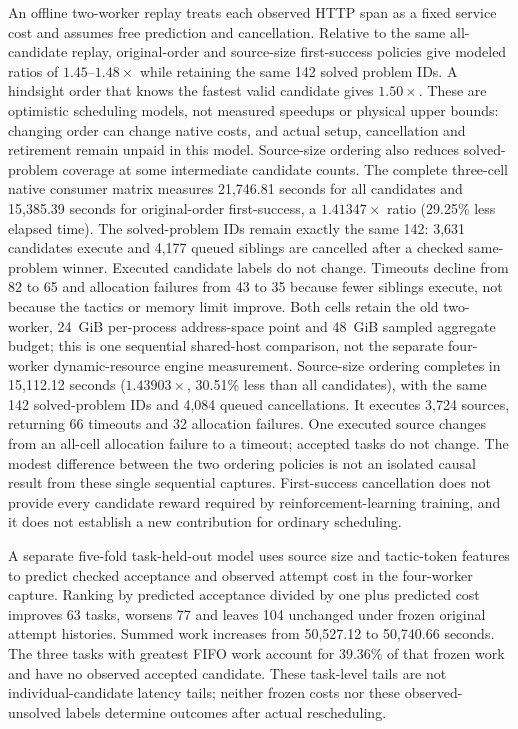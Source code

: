 \documentclass[10pt,twocolumn]{article}
\begin{document}
An offline two-worker replay treats each observed HTTP span as a fixed service
cost and assumes free prediction and cancellation. Relative to the same
all-candidate replay, original-order and source-size first-success policies
give modeled ratios of $1.45$--$1.48\times$ while retaining the same 142 solved
problem IDs. A hindsight order that knows the fastest valid candidate gives
$1.50\times$. These are optimistic scheduling models, not measured speedups
or physical upper bounds: changing order can change native costs, and actual
setup, cancellation and retirement remain unpaid in this model. Source-size
ordering also reduces solved-problem coverage at some intermediate candidate
counts. The complete three-cell native consumer matrix measures
21,746.81 seconds for all candidates and 15,385.39 seconds for original-order
first-success, a $1.41347\times$ ratio (29.25\% less elapsed time).
The solved-problem IDs remain exactly the same 142: 3,631 candidates execute
and 4,177 queued siblings are cancelled after a checked same-problem winner.
Executed candidate labels do not change. Timeouts decline from 82 to 65 and
allocation failures from 43 to 35 because fewer siblings execute, not because
the tactics or memory limit improve. Both cells retain the old two-worker,
24~GiB per-process address-space point and 48~GiB sampled aggregate budget;
this is one sequential shared-host comparison, not the separate four-worker
dynamic-resource engine measurement. Source-size ordering completes in 15,112.12 seconds
($1.43903\times$, 30.51\% less than all candidates), with the same 142
solved-problem IDs and 4,084 queued cancellations. It executes 3,724 sources,
returning 66 timeouts and 32 allocation failures. One executed source changes
from an all-cell allocation failure to a timeout; accepted tasks do not change.
The modest difference between the two ordering policies is not an isolated
causal result from these single sequential captures.
First-success cancellation does not
provide every candidate reward required by reinforcement-learning training,
and it does not establish a new contribution for ordinary scheduling.

A separate five-fold task-held-out model uses source size and tactic-token
features to predict checked acceptance and observed attempt cost in the
four-worker capture. Ranking by predicted acceptance divided by one plus
predicted cost improves 63 tasks, worsens 77 and leaves 104 unchanged under
frozen original attempt histories. Summed work increases from 50,527.12 to
50,740.66 seconds. The three tasks with greatest FIFO work account for 39.36\%
of that frozen work and have no observed accepted candidate. These task-level
tails are not individual-candidate latency tails; neither frozen costs nor
these observed-unsolved labels determine outcomes after actual rescheduling.
\end{document}
